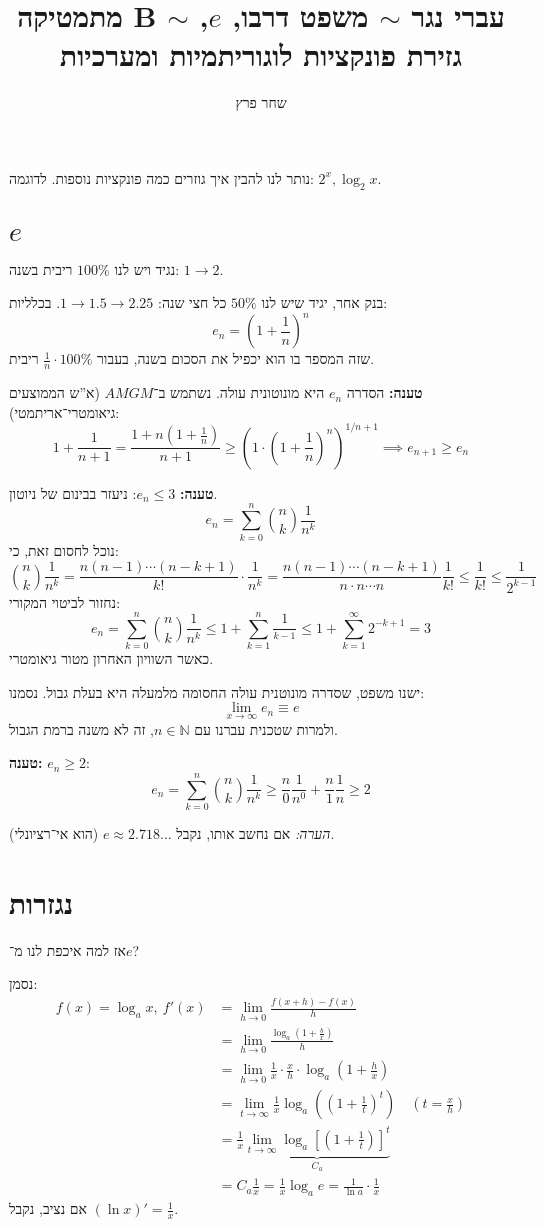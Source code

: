 \documentclass[]{article}
\author{שחר פרץ}
\title{מתמטיקה B $\sim$ עברי נגר $\sim$ משפט דרבו, $e$, גזירת פונקציות לוגוריתמיות ומערכיות}
\newcommand\N     {\mathbb{N}}
\newcommand\limhz {\lim_{h \to 0}}
\newcommand\limi  {\lim_{x \to \infty}}
\renewcommand\inf {\infty}
\newcommand\sumnk     {\sum_{k = 0}^{n}}
\newcommand\sumnko    {\sum_{k = 1}^{n}}
\newcommand\bink      {\binom{n}{k}}
\newcommand\cl [1]    {\left ( #1 \right )}
\begin{document}
	\maketitle
	
	נותר לנו להבין איך גוזרים כמה פונקציות נוספות. לדוגמה: $2^{x}, \log_2x$. 
	\section{$e$}
	נגיד ויש לנו $100\%$ ריבית בשנה: $1 \to 2$. 
	
	בנק אחר, יגיד שיש לנו $50\%$ כל חצי שנה: $1 \to 1.5 \to 2.25 $. בכלליות: 
	\[ e_n = \left (1 + \frac{1}{n}\right )^{n} \]
	שזה המספר בו הוא יכפיל את הסכום בשנה, בעבור $\frac{1}{n} \cdot 100\% $ ריבית. 
	
	\textbf{טענה: }הסדרה $e_n$ היא מונוטונית עולה. נשתמש ב־$AMGM$ (א''ש הממוצעים גיאומטרי־אריתמטי): 
	\[ 1 + \frac{1}{n + 1} = \frac{1 + n(1 + \frac{1}{n})}{n + 1} \ge \cl{1 \cdot \cl{1 + \frac{1}{n}}^{n}}^{1/n + 1} \implies e_{n + 1} \ge e_n \]
	
	\textbf{טענה: }$e_n \le 3$: ניעזר בבינום של ניוטון. 
	\[ e_n = \sumnk \bink \frac{1}{n^{k}} \]
	נוכל לחסום זאת, כי: 
	\[ \bink \frac{1}{n^{k}} = \frac{n(n - 1) \cdots (n - k + 1)}{k!} \cdot \frac{1}{n^{k}} = \frac{n(n - 1) \cdots (n - k + 1)}{n \cdot n \cdots n} \frac{1}{k!} \le \frac{1}{k!} \le \frac{1}{2^{k - 1}} \]
	נחזור לביטוי המקורי: 
	\[ e_n = \sumnk \bink \frac{1}{n^{k}} \le 1 + \sumnko \frac{1}{^{k - 1}} \le 1 + \sum_{k = 1}^{\inf} 2^{-k + 1} = 3 \]
	כאשר השוויון האחרון מטור גיאומטרי. 
	
	ישנו משפט, שסדרה מונוטנית עולה החסומה מלמעלה היא בעלת גבול. נסמנו: 
	\[ \limi e_n \equiv e \]
	ולמרות שטכנית עברנו עם $n \in \N$, זה לא משנה ברמת הגבול. 
	
	\textbf{טענה: }$e_n \ge 2$: 
	\[ e_n = \sumnk \bink \frac{1}{n^{k}} \ge \frac{n}{0}\frac{1}{n^{0}} + \frac{n}{1}\frac{1}{n} \ge 2 \]
	
	\textit{הערה: }אם נחשב אותו, נקבל $e \approx 2.718\dots$ (הוא אי־רציונלי). 
	
	\section{נגזרות}
	אז למה איכפת לנו מ־$e$?
	
	נסמן: 
	\begin{align}
		f(x) = \log_ax, \ f'(x) &= \lim_{h \to 0}\frac{f(x + h) - f(x)}{h}\\
		&=\limhz \frac{\log_a(1 + \frac{b}{x})}{h} \\
		&=\limhz \frac{1}{x}\cdot \frac{x}{h} \cdot \log_a\left (1 + \frac{h}{x} \right ) \\
		&= \lim_{t \to \inf} \frac{1}{x}\log_a\cl{\cl{1+\frac{1}{t}}^{t}} \quad \cl{t = \frac{x}{h}} \\
		&= \frac{1}{x} \underbrace{\lim_{t \to \inf}\log_a \left [ \cl{1 + \frac{1}{t}} \right ]^{t}}_{C_a}\\
		&= C_a \frac{1}{x} = \frac{1}{x}\log_a e = \frac{1}{\ln a}\cdot \frac{1}{x}
	\end{align}
	אם נציב, נקבל $(\ln x)' = \frac{1}{x}$. 
	
\end{document}
